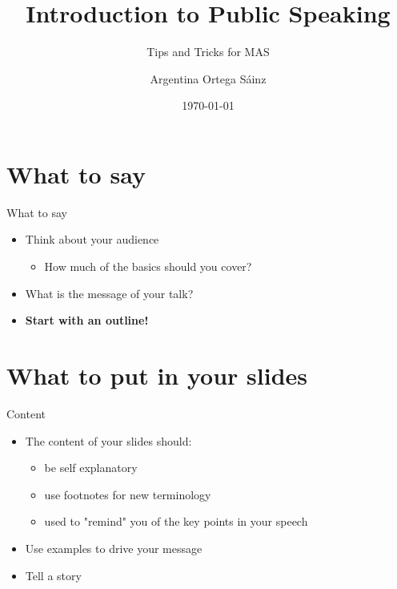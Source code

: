 \documentclass{beamer}
\author[Ortega]{Argentina Ortega S\'ainz}
\title{Introduction to Public Speaking}
\subtitle{Tips and Tricks for MAS}
\institute[HBRS]{Hochschule Bonn-Rhein-Sieg}
\date{\today}
\begin{document}
{
\begin{frame}
\titlepage
\end{frame}
}

%

\section{What to say}

\begin{frame}[t]{What to say}
    \begin{itemize}
        \item Think about your audience
        \begin{itemize}
            \item How much of the basics should you cover?
        \end{itemize}
        \item What is the message of your talk?
        \item \textbf{Start with an outline!}
    \end{itemize}
\end{frame}


\section{What to put in your slides}
\begin{frame}[t]{Content}
    \begin{itemize}
        \item The content of your slides should:
        \begin{itemize}
            \item be self explanatory
            \item use footnotes for new terminology
            \item used to "remind" you of the key points in your speech
        \end{itemize}
        \item Use examples to drive your message
        \item Tell a story
    \end{itemize}
\end{frame}
\end{document}
